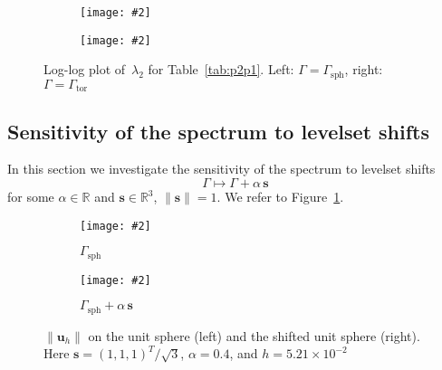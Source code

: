 \documentclass[12pt]{article}
\newcommand{\includegraphicsw}[2][1.]{\texttt{[image: \#2]}}
\newcommand{\vect}[1]{\boldsymbol{\mathbf{#1}}}
\newcommand{\sphere}{{\Gamma_{\text{sph}}}}
\newcommand{\tor}{{\Gamma_{\text{tor}}}}
\begin{document}
\begin{figure}[H]
	\centering\small
	\begin{subfigure}{.49\linewidth}
		\centering
		\includegraphicsw{sphere_2_P2P1_consistent.png}
	\end{subfigure}%
	\hfill
	\begin{subfigure}{.49\linewidth}
		\centering
		\includegraphicsw{torus_P2P1_consistent.png}
	\end{subfigure}
	\caption{Log-log plot of~$\lambda_2$ for Table~\ref{tab:p2p1}. Left: $\Gamma = \sphere$, right: $\Gamma = \tor$}
\end{figure}

\subsection{Sensitivity of the spectrum to levelset shifts}

In this section we investigate the sensitivity of the spectrum to levelset shifts
\begin{equation}\label{shift}
\Gamma \mapsto \Gamma + \alpha\,\vect s
\end{equation}
for some $\alpha \in \mathbb R$ and $\vect s \in \mathbb R^3$, $\|\vect s\| = 1$. We refer to Figure~\ref{fig:shift}.

\begin{figure}[H]
	\centering
	\begin{subfigure}{.2\linewidth}\end{subfigure}%
	\begin{subfigure}{.3\linewidth}
		\centering
		\includegraphicsw[.9]{{shift_0.0.cropped}.png}
		\caption{$\sphere$}
	\end{subfigure}%
	\begin{subfigure}{.3\linewidth}
		\centering
		\includegraphicsw[.9]{{shift_0.4.cropped}.png}
		\caption{$\sphere + \alpha\,\vect s$}
	\end{subfigure}%
	\begin{subfigure}{.2\linewidth}\end{subfigure}%
	\caption{$\|\vect u_h\|$ on the unit sphere (left) and the shifted unit sphere (right). Here $\vect s = (1, 1, 1)^T/\sqrt{3}$, $\alpha = 0.4$, and $h = 5.21\times10^{-2}$}
	\label{fig:shift}		
\end{figure}
\end{document}
